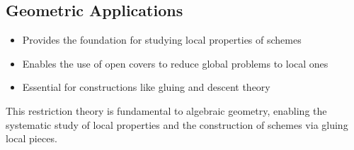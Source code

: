 \documentclass{article}
\theoremstyle{definition}
\begin{document}
\subsection{Geometric Applications}
\begin{itemize}
\item Provides the foundation for studying local properties of schemes
\item Enables the use of open covers to reduce global problems to local ones
\item Essential for constructions like gluing and descent theory
\end{itemize}

This restriction theory is fundamental to algebraic geometry, enabling the systematic study of local properties and the construction of schemes via gluing local pieces.
\end{document}
